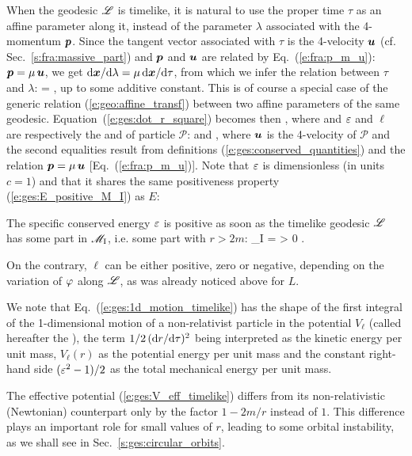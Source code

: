 When the geodesic $\mathscr{L}$ is timelike, it is natural to use the proper time $\tau$
as an affine parameter along it, instead of the parameter $\lambda$ associated
with the 4-momentum $\bm{p}$. Since the tangent vector associated with $\tau$
is the 4-velocity $\bm{u}$ (cf. Sec.~\ref{s:fra:massive_part}) and $\bm{p}$ and $\bm{u}$ are related by
Eq.~(\ref{e:fra:p_m_u}): $\bm{p} = \mu \, \bm{u}$, we get
$\mathrm{d}\bm{x}/\mathrm{d}\lambda = \mu \, \mathrm{d}\bm{x}/\mathrm{d}\tau$, from which we infer the relation
between $\tau$ and $\lambda$:
\be
    \tau = \mu \lambda ,
\ee
up to some additive constant. This is
of course a special case of the generic relation (\ref{e:geo:affine_transf})
between two affine parameters of the same geodesic.
Equation~(\ref{e:ges:dot_r_square}) becomes then
\be \label{e:ges:1d_motion_timelike}
     ,
\ee
where
\be \label{e:ges:V_eff_timelike}
\ee
and $\varepsilon$ and $\ell$ are respectively the
and 
of particle $\mathscr{P}$:
\be \label{e:ges:def_eps_ell}
  \qquad\mbox{and}\qquad
   ,
\ee
where $\bm{u}$ is the 4-velocity of $\mathscr{P}$ and the second equalities
result from definitions (\ref{e:ges:conserved_quantities})
and the relation $\bm{p} = \mu \, \bm{u}$ [Eq.~(\ref{e:fra:p_m_u})].
Note that $\varepsilon$ is dimensionless (in units $c=1$) and that it shares the
same positiveness property (\ref{e:ges:E_positive_M_I}) as $E$:
\begin{prop}
The specific conserved energy $\varepsilon$ is positive as soon as the
timelike geodesic $\mathscr{L}$ has some part
in $\mathscr{M}_{\rm I}$, i.e. some part with $r>2m$:
\be \label{e:ges:eps_positive_M_I}
    \Li \cap \M_{\rm I} \not= \varnothing \quad \Longrightarrow \quad \veps > 0 .
\ee
\end{prop}
On the contrary, $\ell$ can be either positive, zero or negative, depending
on the variation of $\varphi$ along $\mathscr{L}$, as was already noticed above for $L$.

We note that Eq.~(\ref{e:ges:1d_motion_timelike}) has the shape of the
first integral of the
1-dimensional motion of a non-relativist particle in the potential
$V_{\ell}$ (called hereafter the ), the term $1/2 \, (\mathrm{d} r/\mathrm{d}\tau)^2$ being interpreted as
the kinetic energy per unit mass, $V_{\ell}(r)$ as the potential
energy per unit mass and the constant right-hand side $(\varepsilon^2-1)/2$ as the total
mechanical energy per unit mass.
\begin{remark} \label{r:ges:V_eff_Newt}
The effective potential (\ref{e:ges:V_eff_timelike}) differs from its
non-relativistic (Newtonian) counterpart only by the factor $1-2m/r$ instead of
$1$. This difference plays an important role for small values of $r$,
leading to some orbital instability, as we shall see in Sec.~\ref{s:ges:circular_orbits}.
\end{remark}


